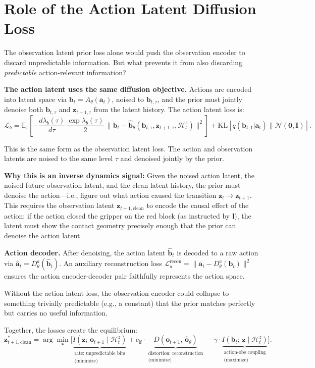 \documentclass{article}
\newcommand{\vo}{\bm{o}}
\newcommand{\vz}{\bm{z}}
\newcommand{\va}{\bm{a}}
\newcommand{\vb}{\bm{b}}
\newcommand{\loss}{\mathcal{L}}
\newcommand{\E}{\mathbb{E}}
\newcommand{\KL}{\mathrm{KL}}
\begin{document}
\section{Role of the Action Latent Diffusion Loss}

The observation latent prior loss alone would push the observation encoder to discard unpredictable information. But what prevents it from also discarding \emph{predictable} action-relevant information?

\textbf{The action latent uses the same diffusion objective.}
Actions are encoded into latent space via $\vb_t = A_\theta(\va_t)$, noised to $\vb_{t,\tau}$, and the prior must jointly denoise both $\vb_{t,\tau}$ and $\vz_{t+1,\tau}$ from the latent history. The action latent loss is:
\begin{equation}
  \loss_b = \E_{\tau}\!\left[-\frac{d\lambda_b(\tau)}{d\tau}\,\frac{\exp\lambda_b(\tau)}{2}\,\|\vb_t - \hat{\vb}_\theta(\vb_{t,\tau}, \vz_{t+1,\tau}, \mathcal{H}_t^z)\|^2\right] + \KL[q(\vb_{t,1}|\va_t) \| \mathcal{N}(\bm{0},\bm{I})].
\end{equation}

This is the same form as the observation latent loss. The action and observation latents are noised to the same level $\tau$ and denoised jointly by the prior.

\textbf{Why this is an inverse dynamics signal:} Given the noised action latent, the noised future observation latent, and the clean latent history, the prior must denoise the action---i.e., figure out what action caused the transition $\vz_t \to \vz_{t+1}$. This requires the observation latent $\vz_{t+1,\text{clean}}$ to encode the causal effect of the action: if the action closed the gripper on the red block (as instructed by $\bm{l}$), the latent must show the contact geometry precisely enough that the prior can denoise the action latent.

\textbf{Action decoder.} After denoising, the action latent $\hat{\vb}_t$ is decoded to a raw action via $\hat{\va}_t = D_\theta^a(\hat{\vb}_t)$. An auxiliary reconstruction loss $\loss_a^{\text{recon}} = \|\va_t - D_\theta^a(\vb_t)\|^2$ ensures the action encoder-decoder pair faithfully represents the action space.

Without the action latent loss, the observation encoder could collapse to something trivially predictable (e.g., a constant) that the prior matches perfectly but carries no useful information.

Together, the losses create the equilibrium:
\begin{equation}
  \vz_{t+1,\text{clean}}^* = \arg\min_{\vz} \Big[
    \underbrace{I(\vz;\, \vo_{t+1} \mid \mathcal{H}_t^z)}_{\substack{\text{rate: unpredictable bits} \\ \text{(minimize)}}}
    + c_{\text{lf}} \cdot \underbrace{D(\vo_{t+1},\, \hat{\vo}_\theta)}_{\substack{\text{distortion: reconstruction} \\ \text{(minimize)}}}
    - \gamma \cdot \underbrace{I(\vb_t;\, \vz \mid \mathcal{H}_t^z)}_{\substack{\text{action-obs coupling} \\ \text{(maximize)}}}
  \Big].
\end{equation}
\end{document}
